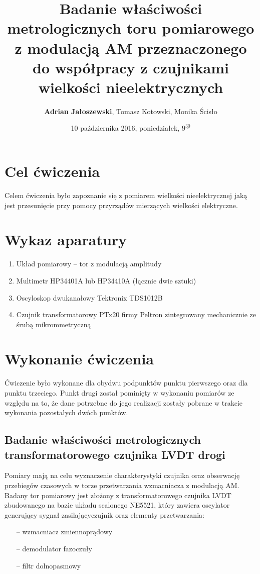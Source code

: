 \documentclass[a4paper, 12pt, titlepage]{article}
\title{Badanie właściwości metrologicznych toru pomiarowego z modulacją AM przeznaczonego do współpracy z czujnikami wielkości nieelektrycznych}
\author{\textbf{Adrian Jałoszewski}, Tomasz Kotowski, Monika Ścisło}
\date{10 października 2016, poniedziałek, $9^{\underline{30}}$}
\begin{document}
	\maketitle
	\tableofcontents
	\newpage
	\section{Cel ćwiczenia}
	Celem ćwiczenia było zapoznanie się z pomiarem wielkości nieelektrycznej jaką jest przesunięcie przy pomocy przyrządów mierzących wielkości elektryczne.
	\section{Wykaz aparatury}
	\begin{enumerate}
		\item Układ pomiarowy -- tor z modulacją amplitudy
		\item Multimetr HP34401A lub HP34410A (łącznie dwie sztuki)
		\item Oscyloskop dwukanałowy Tektronix TDS1012B
		\item Czujnik transformatorowy PTx20 firmy Peltron zintegrowany mechanicznie ze śrubą mikrommetryczną
	\end{enumerate}
	\section{Wykonanie ćwiczenia}
		Ćwiczenie było wykonane dla obydwu podpunktów punktu pierwszego oraz dla punktu trzeciego. Punkt drugi został pominięty w wykonaniu pomiarów ze względu na to, że dane potrzebne do jego realizacji zostały pobrane w trakcie wykonania pozostałych dwóch punktów.
		\subsection{Badanie właściwości metrologicznych transformatorowego czujnika LVDT drogi}
			Pomiary mają na celu wyznaczenie charakterystyki czujnika oraz obserwację przebiegów czasowych w torze przetwarzania wzmacniacza z modulacją AM. Badany tor pomiarowy jest złożony z transformatorowego czujnika LVDT zbudowanego na bazie układu scalonego NE5521, który zawiera oscylator generujący sygnał zasilającyczujnik oraz elementy przetwarzania: 
			\begin{itemize}
				\item[--] wzmacniacz zmiennoprądowy
				\item[--] demodulator fazoczuły
				\item[--] filtr dolnopasmowy
			\end{itemize}
\end{document}
